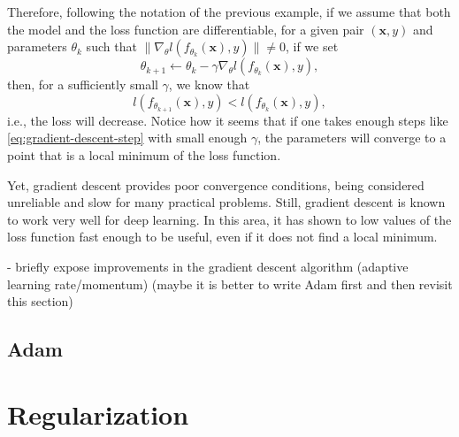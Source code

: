 Therefore, following the notation of the previous example, if we assume that both the model and the loss function are differentiable, for a given pair $(\bm{x},y)$ and parameters $\theta_k$ such that $\| \nabla_\theta l(f_{\theta_k}(\bm{x}),y) \| \neq 0$, if we set \[
\theta_{k+1} \gets \theta_k - \gamma \nabla_\theta l(f_{\theta_k}(\bm{x}),y) \tag{$*$}\label{eq:gradient-descent-step}
,\] then, for a sufficiently small $\gamma$, we know that \[
l(f_{\theta_{k+1}}(\bm{x}),y) < l(f_{\theta_k}(\bm{x}),y)
,\] i.e., the loss will decrease.
Notice how it seems that if one takes enough steps like \eqref{eq:gradient-descent-step} with small enough $\gamma$, the parameters will converge to a point that is a local minimum of the loss function.


Yet, gradient descent provides poor convergence conditions\cite{wolfe_convergence_1969}, being considered unreliable and slow for many practical problems.
Still, gradient descent is known to work very well for deep learning.
In this area, it has shown to low values of the loss function fast enough to be useful, even if it does not find a local minimum.
\cite{goodfellow_deep_2016}

- briefly expose improvements in the gradient descent algorithm (adaptive learning rate/momentum) (maybe it is better to write Adam first and then revisit this section)

\subsection{Adam}

\section{Regularization}

